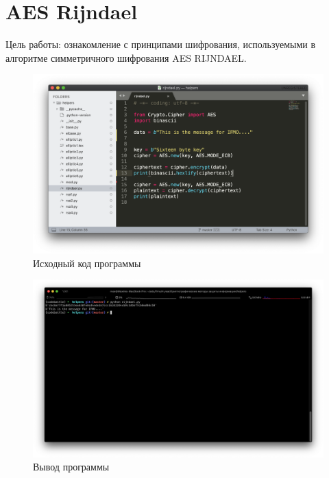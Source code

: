 \section{AES Rijndael}

Цель работы: ознакомление с принципами шифрования, используемыми в алгоритме симметричного шифрования  AES  RIJNDAEL.

\begin{figure}[H]
	\centering
	\includegraphics[width=0.7\linewidth]{"../Лабораторные по Ринджиндайлу/img/listing"}
	\caption{Исходный код программы}
\end{figure}

\begin{figure}[H]
	\centering
	\includegraphics[width=0.7\linewidth]{"../Лабораторные по Ринджиндайлу/img/output"}
	\caption{Вывод программы}
\end{figure}



